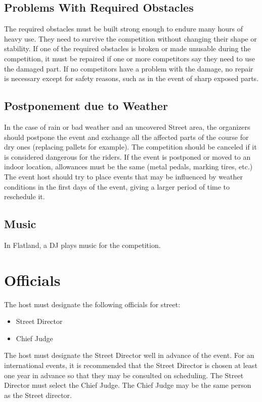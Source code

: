 \subsection{Problems With Required Obstacles}
The required obstacles must be built strong enough to endure many hours of heavy use.
They need to survive the competition without changing their shape or stability.
If one of the required obstacles is broken or made unusable during the competition, it must be repaired if one or more competitors say they need to use the damaged part.
If no competitors have a problem with the damage, no repair is necessary except for safety reasons, such as in the event of sharp exposed parts.

\subsection{Postponement due to Weather}

In the case of rain or bad weather and an uncovered Street area, the organizers should postpone the event and exchange all the affected parts of the course for dry ones (replacing pallets for example).
The competition should be canceled if it is considered dangerous for the riders.
If the event is postponed or moved to an indoor location, allowances must be the same (metal pedals, marking tires, etc.)
The event host should try to place events that may be influenced by weather conditions in the first days of the event, giving a larger period of time to reschedule it.

\subsection{Music}
In Flatland, a DJ plays music for the competition.

\section{Officials}

The host must designate the following officials for street:
\begin{itemize}
\item Street Director
\item Chief Judge
\end{itemize}

The host must designate the Street Director well in advance of the event.
For an international events, it is recommended that the Street Director is chosen at least one year in advance so that they may be consulted on scheduling.
The Street Director must select the Chief Judge.
The Chief Judge may be the same person as the Street director.

